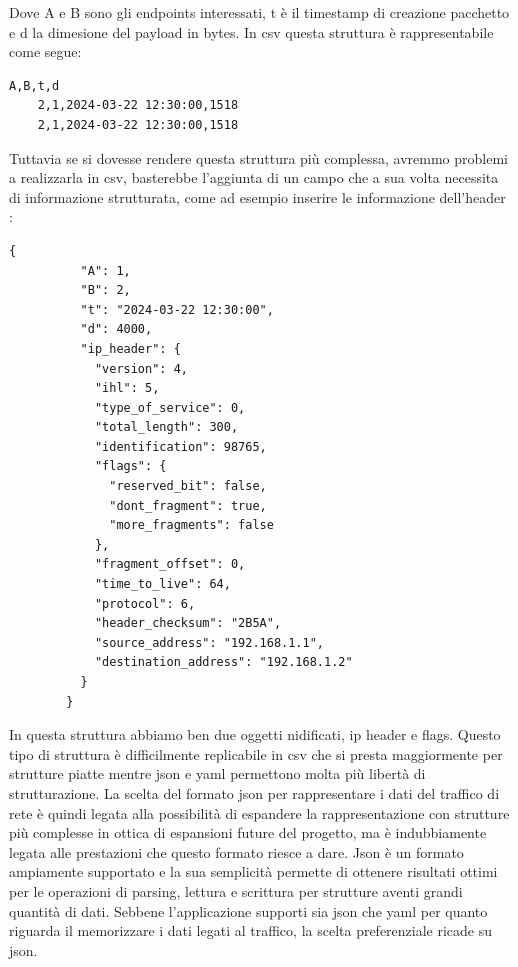 \documentclass[binding=0.6cm]{sapthesis}
\begin{document}
Dove A e B sono gli endpoints interessati, t è il timestamp di creazione pacchetto e d 
la dimesione del payload in bytes. In csv questa struttura è rappresentabile come segue:

{\scriptsize %
\begin{lstlisting}[caption={Pacchetti di rete rappresentati in csv}]
    A,B,t,d
    2,1,2024-03-22 12:30:00,1518
    2,1,2024-03-22 12:30:00,1518
\end{lstlisting}
}

Tuttavia se si dovesse rendere questa struttura più complessa, avremmo problemi a realizzarla in csv, basterebbe l'aggiunta
di un campo che a sua volta necessita di informazione strutturata, come ad esempio 
inserire le informazione dell'header \cite{RFC791}:
{\scriptsize %
\begin{lstlisting}[caption={Pacchetto di rete maggiormente strutturato in json}]
        {
          "A": 1,
          "B": 2,
          "t": "2024-03-22 12:30:00",
          "d": 4000,
          "ip_header": {
            "version": 4,
            "ihl": 5,
            "type_of_service": 0,
            "total_length": 300,
            "identification": 98765,
            "flags": {
              "reserved_bit": false,
              "dont_fragment": true,
              "more_fragments": false
            },
            "fragment_offset": 0,
            "time_to_live": 64,
            "protocol": 6,
            "header_checksum": "2B5A",
            "source_address": "192.168.1.1",
            "destination_address": "192.168.1.2"
          }
        }
\end{lstlisting}
}
In questa struttura abbiamo ben due oggetti nidificati, ip header e flags. 
Questo tipo di struttura è difficilmente replicabile in csv che si presta maggiormente
per strutture piatte mentre json e yaml permettono molta più libertà di strutturazione.
La scelta del formato json per rappresentare i dati del traffico di rete è quindi legata alla possibilità di espandere la
rappresentazione con strutture più complesse in ottica di espansioni future del progetto, ma è indubbiamente legata alle prestazioni che questo formato riesce a dare.
Json è un formato ampiamente supportato e la sua semplicità permette di ottenere risultati ottimi per le operazioni di parsing, lettura e scrittura per strutture aventi grandi quantità di dati.
Sebbene l'applicazione supporti sia json che yaml per quanto riguarda il memorizzare i dati legati al traffico, la scelta preferenziale ricade su json.
\end{document}
